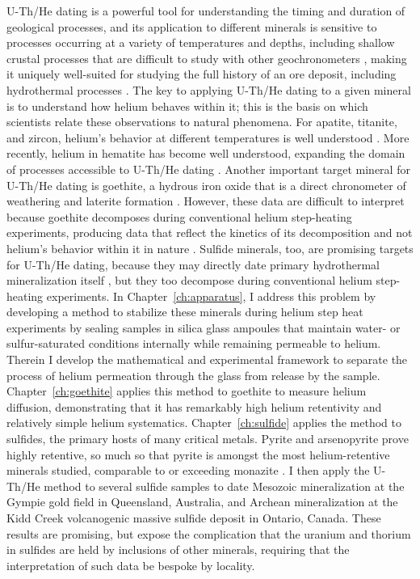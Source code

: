 U-Th/He dating is a powerful tool for understanding the timing and duration of geological processes, and
its application to different minerals is sensitive to processes occurring at a variety of temperatures and depths,
including shallow crustal processes that are difficult to study with other geochronometers \citep{farley2002}, making it uniquely
well-suited for studying the full history of an ore deposit, including hydrothermal processes \citep{mcinnes2005}. 
The key to applying U-Th/He dating to a given mineral is to understand how helium behaves within it; this is
the basis on which scientists relate these observations to natural phenomena. For apatite, titanite, and zircon, helium's
behavior at different temperatures is well understood \citep{farley2000,reinersfarley1999,guenthner2013}. More recently, helium in hematite 
has become well understood, expanding the domain of processes accessible to U-Th/He dating \citep{farleyflowers2012,farley2018}. Another 
important target mineral for U-Th/He dating is goethite, a hydrous iron oxide that is a direct chronometer of weathering and laterite formation
\citep{shustervasconcelos2005,vasconcelos2013,monteiro2014}. However, these data are difficult to interpret because goethite decomposes during
conventional helium step-heating experiments, producing data that reflect the kinetics of its decomposition and not helium's behavior within
it in nature \citep{farley2024}. Sulfide minerals, too, are promising targets for U-Th/He dating, because they may directly date primary hydrothermal
mineralization itself \citep{yakubovich2020}, but they too decompose during conventional helium step-heating experiments. 
In Chapter~\ref{ch:apparatus}, I address this problem by developing a method to stabilize these minerals during helium step heat
experiments by sealing samples in silica glass ampoules that maintain water- or sulfur-saturated conditions internally while remaining
permeable to helium. Therein I develop the mathematical and experimental framework to separate the process of helium permeation through the glass
from release by the sample. Chapter~\ref{ch:goethite} applies this method to goethite to measure helium diffusion, demonstrating that it has remarkably high helium retentivity and relatively simple helium systematics. 
Chapter~\ref{ch:sulfide} applies the method to sulfides, the primary hosts of many critical metals. Pyrite and arsenopyrite
prove highly retentive, so much so that pyrite is amongst the most helium-retentive minerals studied, comparable to or exceeding monazite \citep{farley2007}. I then apply the U-Th/He method to several 
sulfide samples to date Mesozoic mineralization at the Gympie gold field in Queensland, Australia, and Archean mineralization
at the Kidd Creek volcanogenic massive sulfide deposit in Ontario, Canada. These results are promising, but expose the complication that 
the uranium and thorium in sulfides are held by inclusions of other minerals, requiring that the interpretation of such data be bespoke
by locality.

